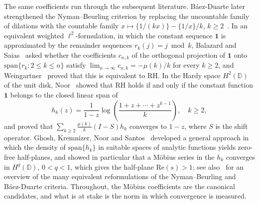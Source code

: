 \documentclass[11pt]{extarticle}
\numberwithin{equation}{section}
\theoremstyle{plain}
\theoremstyle{remark}
\begin{document}
The same coefficients run through the subsequent literature. Báez-Duarte later
strengthened the Nyman--Beurling criterion by replacing the uncountable family of
dilations with the countable family $x \mapsto \{1/(kx)\} - \{1/x\}/k$,
$k \geq 2$~\cite{baez}. In an
equivalent weighted $\ell^2$-formulation, in which the constant sequence
$\mathbf{1}$ is approximated by the remainder sequences $r_k(j) = j \bmod k$,
Balazard and Saias~\cite{Balazard} asked whether the coefficients $c_{n,k}$ of the
orthogonal projection of $\mathbf{1}$ onto
$\mathrm{span}\{r_k : 2 \leq k \leq n\}$ satisfy
$\lim_{n\to\infty} c_{n,k} = -\mu(k)/k$ for every $k \geq 2$, and
Weingartner~\cite{Weingartner} proved that this is equivalent to RH. In the Hardy
space $H^2(\mathbb{D})$ of the unit disk, Noor~\cite{waleed1} showed that RH holds
if and only if the constant function $\mathbf{1}$ belongs to the closed linear
span of
\[
h_k(z) = \frac{1}{1-z}\log\!\left(\frac{1+z+\cdots+z^{k-1}}{k}\right),
\quad k \geq 2,
\]
and proved that $\sum_{k \geq 2} \frac{\mu(k)}{k}(I-S)h_k$ converges to $1-z$,
where $S$ is the shift operator. Ghosh, Kremnizer, Noor and
Santos~\cite{noor-charles} developed a general approach in which the density of
$\mathrm{span}\{h_k\}$ in suitable spaces of analytic functions yields zero-free
half-planes, and showed in particular that a M\"obius series in the $h_k$ converges
in $H^q(\mathbb{D})$, $0 < q < 1$, which gives the half-plane $\mathrm{Re}(s) > 1$;
see also~\cite[pp.~5--6]{noor-charles} for an overview of the many equivalent
reformulations of the Nyman--Beurling and B\'aez-Duarte criteria. Throughout, the M\"obius coefficients are the
canonical candidates, and what is at stake is the norm in which convergence is
measured.
\end{document}

